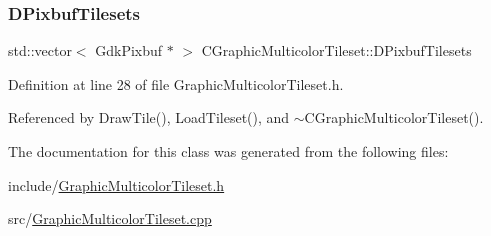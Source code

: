 \subsubsection{\texorpdfstring{D\+Pixbuf\+Tilesets}{DPixbufTilesets}}
{\footnotesize\ttfamily std\+::vector$<$ Gdk\+Pixbuf $\ast$ $>$ C\+Graphic\+Multicolor\+Tileset\+::\+D\+Pixbuf\+Tilesets\hspace{0.3cm}{\ttfamily [protected]}}



Definition at line 28 of file Graphic\+Multicolor\+Tileset.\+h.



Referenced by Draw\+Tile(), Load\+Tileset(), and $\sim$\+C\+Graphic\+Multicolor\+Tileset().



The documentation for this class was generated from the following files\+:\begin{DoxyCompactItemize}
\item 
include/\hyperlink{GraphicMulticolorTileset_8h}{Graphic\+Multicolor\+Tileset.\+h}\item 
src/\hyperlink{GraphicMulticolorTileset_8cpp}{Graphic\+Multicolor\+Tileset.\+cpp}\end{DoxyCompactItemize}
